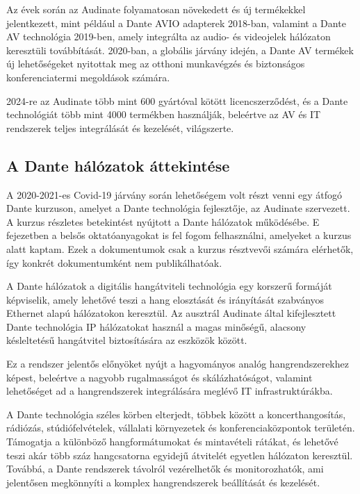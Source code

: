 Az évek során az Audinate folyamatosan növekedett és új termékekkel jelentkezett, 
mint például a Dante AVIO adapterek 2018-ban, valamint a Dante AV technológia 2019-ben, 
amely integrálta az audio- és videojelek hálózaton keresztüli továbbítását. 2020-ban, 
a globális járvány idején, a Dante AV termékek új lehetőségeket nyitottak meg az 
otthoni munkavégzés és biztonságos konferenciatermi megoldások számára.

2024-re az Audinate több mint 600 gyártóval kötött licencszerződést, és a Dante 
technológiát több mint 4000 termékben használják, beleértve az AV és IT rendszerek 
teljes integrálását és kezelését, világszerte.
\subsection{A Dante hálózatok áttekintése}
A 2020-2021-es Covid-19 járvány során lehetőségem volt részt venni egy átfogó Dante
kurzuson, amelyet a Dante technológia fejlesztője, az Audinate szervezett. A kurzus
részletes betekintést nyújtott a Dante hálózatok működésébe. E fejezetben a belsős
oktatóanyagokat is fel fogom felhasználni, amelyeket a kurzus alatt kaptam. Ezek a dokumentumok
csak a kurzus résztvevői számára elérhetők, így konkrét dokumentumként nem publikálhatóak. 

A Dante hálózatok a digitális hangátviteli technológia egy korszerű formáját képviselik, 
amely lehetővé teszi a hang elosztását és irányítását szabványos Ethernet alapú hálózatokon 
keresztül. Az ausztrál Audinate által kifejlesztett Dante technológia IP hálózatokat használ 
a magas minőségű, alacsony késleltetésű hangátvitel biztosítására az eszközök között. 

Ez a rendszer jelentős előnyöket nyújt a hagyományos analóg hangrendszerekhez képest, 
beleértve a nagyobb rugalmasságot és skálázhatóságot, valamint lehetőséget ad a hangrendszerek 
integrálására meglévő IT infrastruktúrákba. 

A Dante technológia széles körben elterjedt, többek között a koncerthangosítás, rádiózás, 
stúdiófelvételek, vállalati környezetek és konferenciaközpontok területén. Támogatja a különböző 
hangformátumokat és mintavételi rátákat, és lehetővé teszi akár több száz hangcsatorna egyidejű 
átvitelét egyetlen hálózaton keresztül. Továbbá, a Dante rendszerek távolról vezérelhetők és 
monitorozhatók, ami jelentősen megkönnyíti a komplex hangrendszerek beállítását és kezelését.
